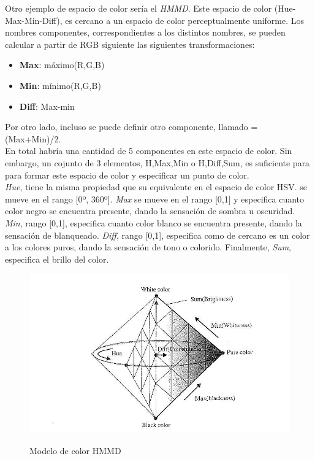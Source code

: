 Otro ejemplo de espacio de color sería el \textit{HMMD}. Este espacio de color (Hue-Max-Min-Diff), es cercano a un espacio de color perceptualmente uniforme. Los nombres componentes, correspondientes a los distintos nombres, se pueden calcular a partir de RGB siguiente las siguientes transformaciones:

\begin{itemize}
\item \textbf{Max}: máximo(R,G,B)
\item \textbf{Min}: mínimo(R,G,B)
\item \textbf{Diff}: Max-min
\end{itemize}

Por otro lado, incluso se puede definir otro componente, llamado  = (Max+Min)/2.\\

En total habría una cantidad de 5 componentes en este espacio de color. Sin embargo, un cojunto de 3 elementos, {H,Max,Min} o {H,Diff,Sum}, es suficiente para para formar este espacio de color y especificar un punto de color.\\

\textit{Hue}, tiene la misma propiedad que su equivalente en el espacio de color HSV.  se mueve en el rango [0º, 360º]. \textit{Max} se mueve en el rango [0,1] y especifica cuanto color negro se encuentra presente, dando la sensación de sombra u oscuridad. \textit{Min}, rango [0,1], especifica cuanto color blanco se encuentra presente, dando la sensación de blanqueado. \textit{Diff}, rango [0,1], especifica como de cercano es un color a los colores puros, dando la sensación de tono o colorido. Finalmente, \textit{Sum}, especifica el brillo del color.
 
\begin{figure}[H] %
\centering
\includegraphics[scale=0.7]{imagenes/hmmd1.jpg}  %
\label{hmmd1.jpg}
\caption{Modelo de color HMMD}
\end{figure}

